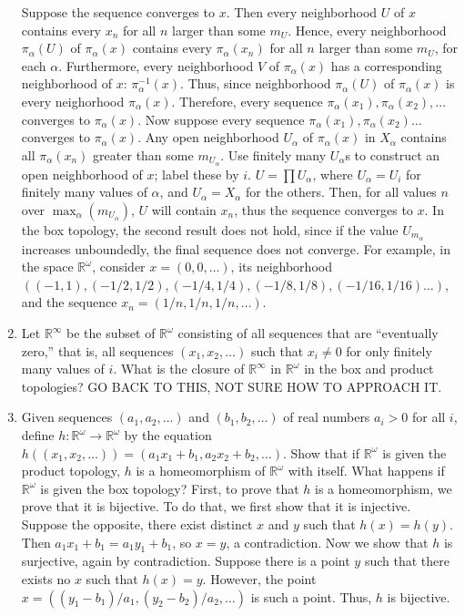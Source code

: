 \documentclass[12pt,letterpaper]{article}
\begin{document}
\begin{enumerate}
  \indent Suppose the sequence converges to $x$. Then every neighborhood $U$ of $x$ contains every $x_n$ for all $n$ larger than some $m_U$. Hence, every neighborhood $\pi_\alpha(U)$ of $\pi_\alpha(x)$ contains every $\pi_\alpha(x_n)$ for all $n$ larger than some $m_U$, for each $\alpha$. Furthermore, every neighborhood $V$ of $\pi_\alpha(x)$ has a corresponding neighborhood of $x$: $\pi^{-1}_\alpha(x)$. Thus, since neighborhood $\pi_\alpha(U)$ of $\pi_\alpha(x)$ is every neighorhood $\pi_\alpha(x)$. Therefore, every sequence $\pi_\alpha(x_1), \pi_\alpha(x_2),\dots$ converges to $\pi_\alpha(x)$.\n
  \indent Now suppose every sequence $\pi_\alpha(x_1), \pi_\alpha(x_2)\dots$ converges to $\pi_\alpha(x)$. Any open neighborhood $U_\alpha$ of $\pi_\alpha(x)$ in $X_\alpha$ contains all $\pi_\alpha(x_n)$ greater than some $m_{U_\alpha}$. Use finitely many $U_\alpha$s to construct an open neighborhood of $x$; label these by $i$. $U=\prod U_\alpha$, where $U_\alpha=U_i$ for finitely many values of $\alpha$, and $U_\alpha=X_\alpha$ for the others. Then, for all values $n$ over $\max_\alpha(m_{U_\alpha})$, $U$ will contain $x_n$, thus the sequence converges to $x$.\n
  \indent In the box topology, the second result does not hold, since if the value $U_{m_\alpha}$ increases unboundedly, the final sequence does not converge. For example, in the space $\mathbb{R}^\omega$, consider $x=(0,0,\dots)$, its neighborhood $((-1,1),\allowbreak (-1/2,1/2),\allowbreak (-1/4,1/4),\allowbreak (-1/8,1/8),\allowbreak (-1/16,1/16)\dots)$, and the sequence $x_n = (1/n,1/n,1/n,\dots)$.
  \item Let $\mathbb{R}^\infty$ be the subset of $\mathbb{R}^\omega$ consisting of all sequences that are ``eventually zero,'' that is, all sequences $(x_1, x_2,\dots)$ such that $x_i\neq 0$ for only finitely many values of $i$. What is the closure of $\mathbb{R}^\infty$ in $\mathbb{R}^\omega$ in the box and product topologies?\n
  \indent GO BACK TO THIS, NOT SURE HOW TO APPROACH IT.
  \item Given sequences $(a_1, a_2, \dots)$ and $(b_1, b_2,\dots)$ of real numbers $a_i > 0$ for all $i$, define $h: \mathbb{R}^\omega \rightarrow \mathbb{R}^\omega$ by the equation $h((x_1, x_2, \dots)) = (a_1x_1+b_1, a_2x_2+b_2, \dots)$. Show that if $\mathbb{R}^\omega$ is given the product topology, $h$ is a homeomorphism of $\mathbb{R}^\omega$ with itself. What happens if $\mathbb{R}^\omega$ is given the box topology?\hspace{5in}\n
  \indent First, to prove that $h$ is a homeomorphism, we prove that it is bijective. To do that, we first show that it is injective. Suppose the opposite, there exist distinct $x$ and $y$ such that $h(x)=h(y)$. Then $a_1x_1+b_1 = a_1y_1 + b_1$, so $x=y$, a contradiction. Now we show that $h$ is surjective, again by contradiction. Suppose there is a point $y$ such that there exists no $x$ such that $h(x)=y$. However, the point $x=((y_1-b_1)/a_1, (y_2-b_2)/a_2, \dots)$ is such a point. Thus, $h$ is bijective. \hspace{5in}\n

\end{enumerate}
\end{document}
